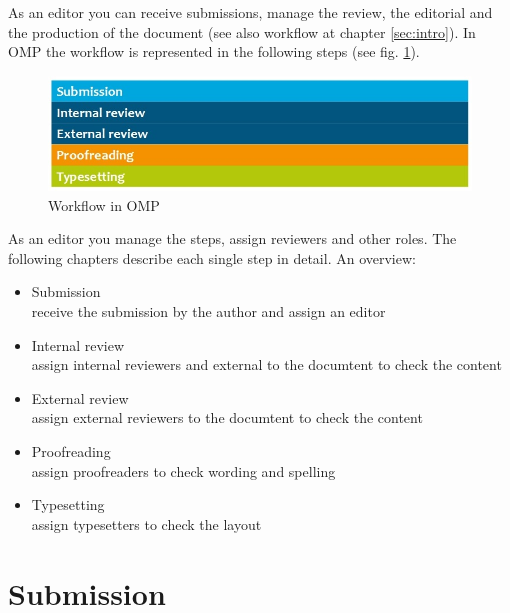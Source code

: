 As an editor you can receive submissions, manage the review, the editorial and the production of the document (see also workflow at chapter \ref{sec:intro}). In OMP the workflow is represented in the following steps (see fig. \ref{fig:workflowOmp}).

\begin{figure}[h] \centering
\includegraphics[width=1\textwidth]{./img/workflow_omp.jpg} \caption{Workflow in OMP}
\label{fig:workflowOmp}
\end{figure}

As an editor you manage the steps, assign reviewers and other roles. The following chapters describe each single step in detail. An overview:

\begin{itemize}
\item Submission \\receive the submission by the author and assign an editor
\item Internal review \\assign internal reviewers and external to the documtent to check the content 
\item External review \\assign external reviewers to the documtent to check the content
\item Proofreading \\assign proofreaders to check wording and spelling
\item Typesetting \\assign typesetters to check the layout
\end{itemize}

\newpage


\section{Submission}

